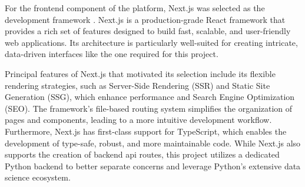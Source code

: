 For the frontend component of the platform, Next.js was selected as the development framework \cite{NEXTJS}. Next.js is a production-grade React framework that provides a rich set of features designed to build fast, scalable, and user-friendly web applications. Its architecture is particularly well-suited for creating intricate, data-driven interfaces like the one required for this project.

Principal features of Next.js that motivated its selection include its flexible rendering strategies, such as Server-Side Rendering (SSR) and Static Site Generation (SSG), which enhance performance and Search Engine Optimization (SEO). The framework's file-based routing system simplifies the organization of pages and components, leading to a more intuitive development workflow. Furthermore, Next.js has first-class support for TypeScript, which enables the development of type-safe, robust, and more maintainable code. While Next.js also supports the creation of backend \acs{api} routes, this project utilizes a dedicated Python backend to better separate concerns and leverage Python's extensive data science ecosystem.